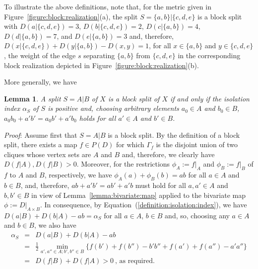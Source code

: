 \documentclass[12pt]{article}
\newtheorem{lemma}[prop]{Lemma}
\begin{document}
To illustrate the above definitions, 
note that, 
for the metric given in Figure~\ref{figure:block:realization}(a),
the split $S=\{a,b\}|\{c,d,e\}$ is a block split with 
$D(a|\{c,d,e\})=3$, $D(b|\{c,d,e\})=2$, $D(c|\{a,b\})=4$, $D(d|\{a,b\})=7$, and $D(e|\{a,b\})=3$ and, therefore, 
$D(x|\{c,d,e\})+D(y|\{a,b\})- D(x,y) = 1$, for all $x\in \{a,b\}$ and $y\in \{c,d,e\}$, 
the weight of the edge $s$ separating $\{a,b\}$ from $\{c,d,e\}$ in the corresponding block realization depicted
in Figure~\ref{figure:block:realization}(b).


More generally, we have

\begin{lemma}
\label{lemma:characterization:block:splits}
A split \(S=A|B\) of \(X\) 
is a block split of \(X\) if and only 
if the isolation index $\alpha_{S}$ of $S$ is positive and, choosing
arbitrary elements \(a_0 \in A\) and \(b_0 \in B\),
$a_0b_0+a'b'=a_0b'+a'b_0$ holds for all $a'\in A$ and \(b' \in B\).
\end{lemma}

\noindent\textsl{Proof}:
Assume first that \(S=A|B\) is a block split. By the definition of a block split, 
there exists a map \(f \in P(D)\) for which
\(\Gamma_f\) is the disjoint union of two cliques whose
vertex sets are \(A\) and \(B\) and, therefore, we clearly have 
$D(f|A),D(f|B)>0$. Moreover, for the restrictions $\phi_A:=f|_A$ and 
$\phi_B:=f|_B$ of \(f\) to \(A\) and \(B\), respectively, we have 
\(\phi_A(a) + \phi_B(b) = ab\) for all \(a \in A\) and \(b \in B\), and,
therefore, $ab+a'b'=ab'+a'b$ must hold for all $a,a'\in A$ and
\(b,b' \in B\) in view of Lemma~\ref{lemma:bivariate:map} applied to the bivariate
map \(\phi:=D|_{A \times B}\).
In consequence, by Equation~(\ref{definition:isolation:index}),
we have $D(a|B) + D(b|A) - ab= \alpha_S$ for all \(a \in A\), \(b \in B\) and,
so, choosing any  \(a \in A\) and \(b \in B\), we also have
\begin{eqnarray*}
\alpha_S &=&  D(a|B) + D(b|A) - ab\\
&=&  \frac{1}{2} \min_{a',a''\in A; b',b'' \in B}\{f(b') +f(b'') - b'b'' + f(a') +f(a'') -a'a'' \}\\
&=& D(f|B) + D(f|A)>0 \ \text{, as required}.
\end{eqnarray*}
\end{document}
